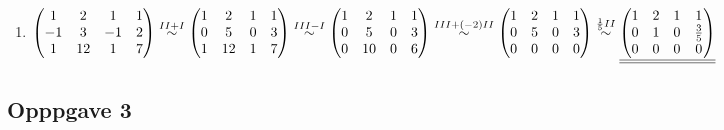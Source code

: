 \documentclass{article}
\newcommand{\uu}[1]{\underline{\underline{#1}}}
\newcommand{\eqto}[1]{\overset{#1}{\sim}}
\begin{document}
\begin{enumerate}[A=]
    \item \(
    \begin{pmatrix}
        1&2&1&1\\-1&3&-1&2\\1&12&1&7
    \end{pmatrix}
    \eqto{II+I}
    \begin{pmatrix}
        1&2&1&1\\0&5&0&3\\1&12&1&7
    \end{pmatrix}
    \eqto{III-I}
    \begin{pmatrix}
        1&2&1&1\\0&5&0&3\\0&10&0&6
    \end{pmatrix}
    \eqto{III+(-2)II}
    \begin{pmatrix}
        1&2&1&1\\0&5&0&3\\0&0&0&0
    \end{pmatrix}
    \eqto{\frac{1}{5}II}\\ \\ \\
    \uu{\begin{pmatrix}
        1&2&1&1\\0&1&0&\frac{3}{5}\\0&0&0&0
    \end{pmatrix}}
    \)

    \vspace{3em}

\end{enumerate}




\subsection*{Opppgave 3}
\end{document}
